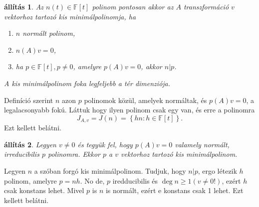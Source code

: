 \documentclass[a4paper, showtrims]{memoir}
\makeatletter
\renewenvironment{proof}[1][\proofname]
    {\par\pushQED{\qed}%
    \normalfont \topsep6\p@\@plus6\p@\relax
    \trivlist
    \item[\hskip\labelsep
        \itshape
    #1\@addpunct{:}]\ignorespaces}
    {\popQED\endtrivlist\@endpefalse}
\theoremstyle{plain}
\newtheorem{proposition}{állítás}[chapter]
\theoremstyle{remark}
\theoremstyle{definition}
\makeatother
\begin{document}
\begin{proposition}
    Az  $n\left( t \right)\in\mathbb{F}[t]$  
    polinom pontosan akkor az $A$ transzformáció $v$ vektorhoz tartozó kis minimálpolinomja, ha
	\begin{enumerate}
		\item $n$ normált polinom,
		\item $n\left( A \right)v=0$,
		\item ha $p\in\mathbb{F}\left[ t \right], p\neq 0$, amelyre
		      $p\left( A \right)v=0$, akkor $n|p$.
	\end{enumerate}
	A kis minimálpolinom foka legfeljebb a tér dimenziója.
\end{proposition}
\begin{proof}
	Definíció szerint $n$ azon $p$ polinomok közül,
	amelyek normáltak, és $p\left( A \right)v=0$, a legalacsonyabb fokú.
	Láttuk hogy ilyen polinom csak egy van, és erre a polinomra
	\[
		J_{A,v}=J\left( n \right)=\left\{ hn:h\in\mathbb{F}\left[ t \right] \right\}.
	\]
	Ezt kellett belátni.
\end{proof}
\begin{proposition}
	Legyen $v\neq 0$ és tegyük fel, hogy $p\left( A \right)v=0$ valamely normált,
	irreducibilis $p$ polinomra.
	Ekkor $p$ a $v$ vektorhoz tartozó kis minimálpolinom.
\end{proposition}
\begin{proof}
    Legyen $n$ a szóban forgó kis minimálpolinom.
    Tudjuk, hogy $n|p$, ergo létezik $h$ polinom, amelyre $p=nh$.
    No de, $p$ iredducibilis és $\deg n\geq 1 (v\neq 0 !)$, ezért $h$ csak konstans lehet.
    Mivel $p$ is $n$ is normált, ezért e konstans csak 1 lehet.
    Ezt kellett belátni. 
\end{proof}
\end{document}
